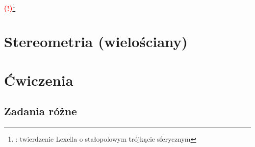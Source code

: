\documentclass{greaseproof}
\newcommand{\todofoot}[1]{\textcolor{red}{\textbf{(!)}\footnote{\textbf{\color{red}{Do zrobienia}}: #1}}}
\begin{document}
\todofoot{twierdzenie Lexella o stałopolowym trójkącie sferycznym}

\chapter{Stereometria (wielościany)}


\chapter{Ćwiczenia}
\section{Zadania różne}

\end{document}
